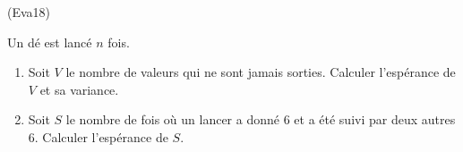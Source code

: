 \begin{tiny}(Eva18)\end{tiny} Un dé est lancé $n$ fois.
\begin{enumerate}
 \item Soit $V$ le nombre de valeurs qui ne sont jamais sorties. Calculer l'espérance de $V$ et sa variance.
 \item Soit $S$ le nombre de fois où un lancer a donné 6 et a été suivi par deux autres 6. Calculer l'espérance de $S$.
\end{enumerate}
  